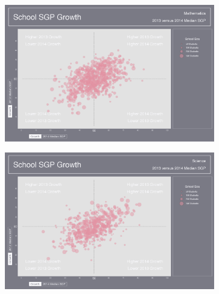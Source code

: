 \documentclass[12pt]{article}
\begin{document}
\begin{figure}[H]
  \begin{subfigure}[b]{\textwidth}
    \includegraphics[width=\textwidth]{../img/Appendices/Appendix_C/Bubble_Plots/School_2013_2014_MATHEMATICS_Growth.png}
  \end{subfigure}
  \begin{subfigure}[b]{\textwidth}
    \includegraphics[width=\textwidth]{../img/Appendices/Appendix_C/Bubble_Plots/School_2013_2014_SCIENCE_Growth.png}
  \end{subfigure}
\end{figure}

\pagebreak
\end{document}
